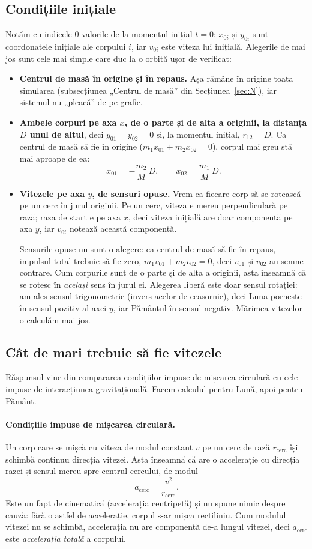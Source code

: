 \documentclass[11pt,a4paper]{article}
\begin{document}
\subsection*{Condițiile inițiale}
Notăm cu indicele $0$ valorile de la momentul inițial $t = 0$: $x_{0i}$ și $y_{0i}$ sunt coordonatele inițiale ale corpului $i$, iar $v_{0i}$ este viteza lui inițială. Alegerile de mai jos sunt cele mai simple care duc la o orbită ușor de verificat:
\begin{itemize}
  \item \textbf{Centrul de masă în origine și în repaus.} Așa rămâne în origine toată simularea (subsecțiunea „Centrul de masă” din Secțiunea~\ref{sec:N}), iar sistemul nu „pleacă” de pe grafic.
  \item \textbf{Ambele corpuri pe axa $x$, de o parte și de alta a originii, la distanța $D$ unul de altul}, deci $y_{01} = y_{02} = 0$ și, la momentul inițial, $r_{12} = D$. Ca centrul de masă să fie în origine ($m_1 x_{01} + m_2 x_{02} = 0$), corpul mai greu stă mai aproape de ea:
  \[
    x_{01} = -\frac{m_2}{M}\,D, \qquad x_{02} = \frac{m_1}{M}\,D .
  \]
  \item \textbf{Vitezele pe axa $y$, de sensuri opuse.} Vrem ca fiecare corp să se rotească pe un cerc în jurul originii. Pe un cerc, viteza e mereu perpendiculară pe rază; raza de start e pe axa $x$, deci viteza inițială are doar componentă pe axa $y$, iar $v_{0i}$ notează această componentă.

  Sensurile opuse nu sunt o alegere: ca centrul de masă să fie în repaus, impulsul total trebuie să fie zero, $m_1 v_{01} + m_2 v_{02} = 0$, deci $v_{01}$ și $v_{02}$ au semne contrare. Cum corpurile sunt de o parte și de alta a originii, asta înseamnă că se rotesc în \emph{același} sens în jurul ei. Alegerea liberă este doar sensul rotației: am ales sensul trigonometric (invers acelor de ceasornic), deci Luna pornește în sensul pozitiv al axei $y$, iar Pământul în sensul negativ. Mărimea vitezelor o calculăm mai jos.
\end{itemize}

\subsection*{Cât de mari trebuie să fie vitezele}
Răspunsul vine din compararea condițiilor impuse de mișcarea circulară cu cele impuse de interacțiunea gravitațională. Facem calculul pentru Lună, apoi pentru Pământ.

\paragraph{Condițiile impuse de mișcarea circulară.} Un corp care se mișcă cu viteza de modul constant $v$ pe un cerc de rază $r_{\text{cerc}}$ își schimbă continuu direcția vitezei. Asta înseamnă că are o accelerație cu direcția razei și sensul mereu spre centrul cercului, de modul
\[
  a_{\text{cerc}} = \frac{v^2}{r_{\text{cerc}}}.
\]
Este un fapt de cinematică (accelerația centripetă) și nu spune nimic despre cauză: fără o astfel de accelerație, corpul s-ar mișca rectiliniu. Cum modulul vitezei nu se schimbă, accelerația nu are componentă de-a lungul vitezei, deci $a_{\text{cerc}}$ este \emph{accelerația totală} a corpului.
\end{document}
